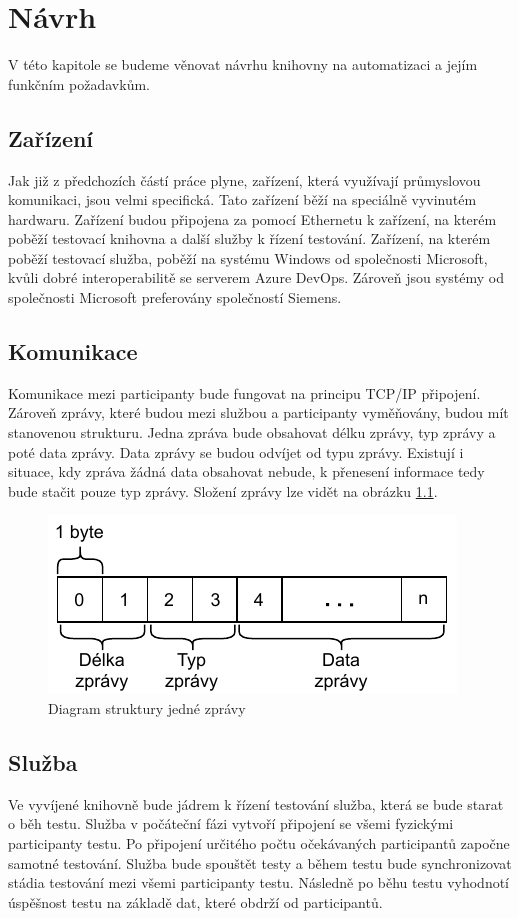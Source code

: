 \chapter{Návrh}

V této kapitole se budeme věnovat návrhu knihovny na automatizaci a jejím funkčním požadavkům.

\section{Zařízení}
Jak již z předchozích částí práce plyne, zařízení, která využívají průmyslovou komunikaci, jsou velmi specifická. Tato zařízení běží na speciálně vyvinutém hardwaru. Zařízení budou připojena za pomocí Ethernetu k zařízení, na kterém poběží testovací knihovna a další služby k řízení testování. Zařízení, na kterém poběží testovací služba, poběží na systému Windows od společnosti Microsoft, kvůli dobré interoperabilitě se serverem Azure DevOps. Zároveň jsou systémy od společnosti Microsoft preferovány společností Siemens. 

\section{Komunikace}
Komunikace mezi participanty bude fungovat na principu TCP/IP připojení. Zároveň zprávy, které budou mezi službou a participanty vyměňovány, budou mít stanovenou strukturu. Jedna zpráva bude obsahovat délku zprávy, typ zprávy a poté data zprávy. Data zprávy se budou odvíjet od typu zprávy. Existují i situace, kdy zpráva žádná data obsahovat nebude, k přenesení informace tedy bude stačit pouze typ zprávy. Složení zprávy lze vidět na obrázku \ref{fig:message}. 

\begin{figure}[htbp]
    \centering 
    \includegraphics{assets/img/message.pdf}
    \caption{Diagram struktury jedné zprávy}
    \label{fig:message}
\end{figure}


\section{Služba}
Ve vyvíjené knihovně bude jádrem k řízení testování služba, která se bude starat o běh testu. Služba v počáteční fázi vytvoří připojení se všemi fyzickými participanty testu. Po připojení určitého počtu očekávaných participantů započne samotné testování. Služba bude spouštět testy a během testu bude synchronizovat stádia testování mezi všemi participanty testu. Následně po běhu testu vyhodnotí úspěšnost testu na základě dat, které obdrží od participantů. 


